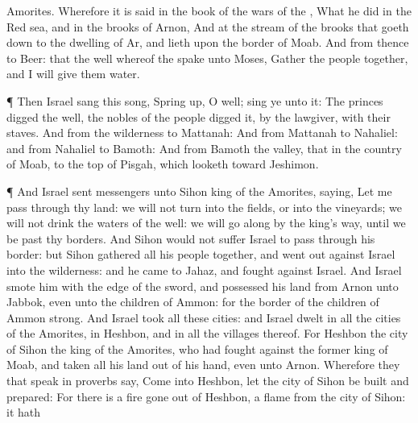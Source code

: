 {Amorites.
Wherefore it is
said in the
book of the
wars of the
{}, What he
did in the Red
sea, and in the
brooks of
Arnon,
And at the
stream of the
brooks that goeth
down to the
dwelling of
Ar, and
lieth upon the
border of
Moab.
And from thence
{} to
Beer: that
{} the
well whereof the
{}
spake unto
Moses,
Gather the
people
together, and I will
give them
water.
\par }{\PP {}¶ Then
Israel
sang this
song, Spring
up, O
well;
sing ye unto it:
The
princes
digged the
well, the
nobles of the
people
digged it, by
{} the
lawgiver, with their
staves. And from the
wilderness
{} to
Mattanah:
And from
Mattanah to
Nahaliel: and from
Nahaliel to
Bamoth:
And from
Bamoth
{} the
valley, that
{} in the
country of
Moab, to the
top of
Pisgah, which
looketh
toward
Jeshimon.
\par }{\PP {}¶ And
Israel
sent
messengers unto
Sihon
king of the
Amorites,
saying,
Let me
pass through thy
land: we will not
turn into the
fields, or into the
vineyards; we will not
drink
{} the
waters of the
well:
{} we will go
along by the
king’s
{}
way, until we be
past thy
borders.
And
Sihon would not
suffer
Israel to
pass through his
border: but
Sihon
gathered all his
people
together, and went
out
against
Israel into the
wilderness: and he
came to
Jahaz, and
fought against
Israel.
And
Israel
smote him with the
edge of the
sword, and
possessed his
land from
Arnon unto
Jabbok, even unto the
children of
Ammon: for the
border of the
children of
Ammon
{}
strong.
And
Israel
took all these
cities: and
Israel
dwelt in all the
cities of the
Amorites, in
Heshbon, and in all the
villages thereof.
For
Heshbon
{} the
city of
Sihon the
king of the
Amorites, who had
fought against the
former
king of
Moab, and
taken all his
land out of his
hand, even unto
Arnon.
Wherefore they that speak in
proverbs
say,
Come into
Heshbon, let the
city of
Sihon be
built and
prepared:
For there is a
fire gone
out of
Heshbon, a
flame from the
city of
Sihon: it hath
}
